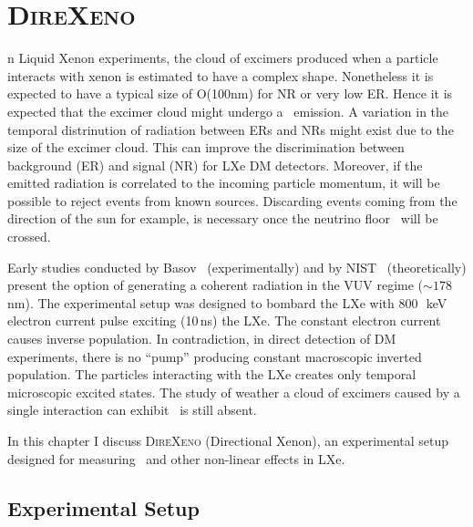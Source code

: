 %
%
\let\textcircled=\pgftextcircled
\chapter{\textsc{DireXeno}}
\label{chap:Direxeno}
n Liquid Xenon experiments, the cloud of excimers produced when a particle interacts with xenon is estimated to have a complex shape. Nonetheless it is expected to have a typical size of O(100nm) for NR or very low ER. Hence it is expected that the excimer cloud might undergo a \superradiance\ emission. A variation in the temporal distrinution of radiation between ERs and NRs might exist due to the size of the excimer cloud. This can improve the discrimination between background (ER) and signal (NR) for LXe DM detectors. Moreover, if the emitted radiation is correlated to the incoming particle momentum, it will be possible to reject events from known sources. Discarding events coming from the direction of the sun for example, is necessary once the neutrino floor~\cite{Billard:2013qya} will be crossed.  

Early studies conducted by Basov~\citep{BasovSRTheory} (experimentally) and by NIST~\cite{stim} (theoretically) present the option of generating a coherent radiation in the VUV regime ($\sim178$\,nm). The experimental setup was designed to bombard the LXe with 800~\,keV electron current pulse exciting (10\,ns) the LXe. The constant electron current causes inverse population. In contradiction, in direct detection of DM experiments, there is no ``pump'' producing constant macroscopic inverted population. The particles interacting with the LXe creates only temporal microscopic excited states.  The study of weather a cloud of excimers caused by a single interaction can exhibit \superradiance\ is still absent.

In this chapter I discuss \textsc{DireXeno} (Directional Xenon), an experimental setup designed for measuring \superradiance\ and other non-linear effects in LXe.

\section{Experimental Setup}
\label{expSetup}


